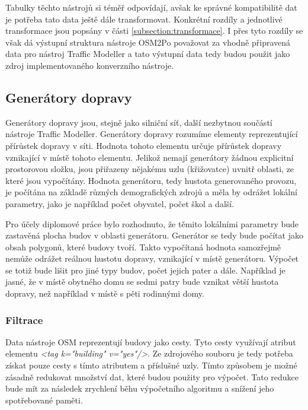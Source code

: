 Tabulky těchto nástrojů si téměř odpovídají, avšak ke správné kompatibilitě dat je potřeba tato data ještě dále transformovat. Konkrétní rozdíly a jednotlivé transformace jsou popsány v části \ref{subsection:transformace}. I přes tyto rozdíly se však dá výstupní struktura nástroje OSM2Po považovat za vhodně připravená data pro nástroj Traffic Modeller a tato výstupní data tedy budou použit jako zdroj implementovaného konverzního nástroje.

\subsection{Generátory dopravy}
\label{generatory_dopravy}

Generátory dopravy jsou, stejně jako silniční síť, další nezbytnou součástí nástroje Traffic Modeller. Generátory dopravy rozumíme elementy reprezentující přírůstek dopravy v síti. Hodnota tohoto elementu určuje přírůstek dopravy vznikající v místě tohoto elementu. Jelikož nemají generátory žádnou explicitní prostorovou složku, jsou přiřazeny nějakému uzlu (křižovatce) uvnitř oblasti, ze které jsou vypočítány. Hodnota generátoru, tedy hustota generovaného provozu, je počítána na základě různých demografických zdrojů a měla by odrážet lokální parametry, jako je například počet obyvatel, počet škol a další.

Pro účely diplomové práce bylo rozhodnuto, že těmito lokálními parametry bude zastavěná plocha budov v oblasti generátoru. Generátor se tedy bude počítat jako obsah polygonů, které budovy tvoří. Takto vypočítaná hodnota samozřejmě nemůže odrážet reálnou hustotu dopravy, vznikající v místě generátoru. Výpočet se totiž bude lišit pro jiné typy budov, počet jejich pater a dále. Například je jasné, že v místě obytného domu se sedmi patry bude vznikat větší hustota dopravy, než například v místě s pěti rodinnými domy. 

\subsubsection{Filtrace}

Data nástroje OSM reprezentují budovy jako cesty. Tyto cesty využívají atribut elementu \textit{<tag k="building" v="yes"/>}. Ze zdrojového souboru je tedy potřeba získat pouze cesty s tímto atributem a příslušné uzly. Tímto způsobem je možné zásadně redukovat množství dat, které budou použity pro výpočet. Tato redukce bude mít za následek zrychlení běhu výpočetního algoritmu a snížení jeho spotřebované paměti. 

